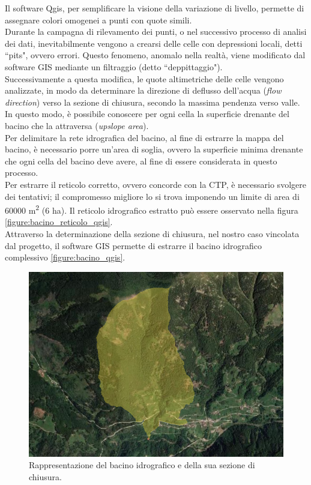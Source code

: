 Il software Qgis, per semplificare la visione della variazione di livello, permette di assegnare colori omogenei a punti con quote simili.\\ 
Durante la campagna di rilevamento dei punti, o nel successivo processo di analisi dei dati, inevitabilmente vengono a crearsi delle celle con depressioni locali, detti ``pits", ovvero errori. Questo fenomeno, anomalo nella realtà, viene modificato dal software GIS mediante un filtraggio (detto ``deppittaggio").\\
Successivamente a questa modifica, le quote altimetriche delle celle vengono analizzate, in modo da determinare la direzione di deflusso dell'acqua (\textit{flow direction}) verso la sezione di chiusura, secondo la massima pendenza verso valle.\\
In questo modo, è possibile conoscere per ogni cella la superficie drenante del bacino che la attraversa (\textit{upslope area}).\\
Per delimitare la rete idrografica del bacino, al fine di estrarre la mappa del bacino, è necessario porre un'area di soglia, ovvero la superficie minima drenante che ogni cella del bacino deve avere, al fine di essere considerata in questo processo.\\
Per estrarre il reticolo corretto, ovvero concorde con la CTP, è necessario svolgere dei tentativi; il compromesso migliore lo si trova imponendo un limite di area di 60000 \unit{m^2} (6 \unit{ha}). Il reticolo idrografico estratto può essere osservato nella figura \eqref{figure:bacino_reticolo_qgis}.\\
Attraverso la determinazione della sezione di chiusura, nel nostro caso vincolata dal progetto, il software GIS permette di estrarre il bacino idrografico complessivo \eqref{figure:bacino_qgis}.\\
\begin{figure}[hbt]\centering
    \includegraphics[scale=.50]{immagini/bacino_qgis.PNG}
    \caption{Rappresentazione del bacino idrografico e della sua sezione di chiusura.}
    \label{figure:bacino_qgis}
\end{figure}
